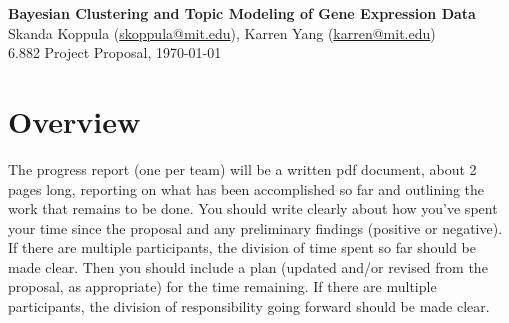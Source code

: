 \documentclass[11pt]{article}
\begin{document}
\begin{centering}
\Large
    \textbf{Bayesian Clustering and Topic Modeling of Gene Expression Data}  \\
    \vspace{2mm}
    \normalsize
    Skanda Koppula (\url{skoppula@mit.edu}), Karren Yang (\url{karren@mit.edu}) \\
    \vspace{2mm}
    \normalsize
    6.882 Project Proposal, \today \\
\end{centering}
\vspace{5mm}

\section{Overview}

The progress report (one per team) will be a written pdf document, about 2 pages long,
reporting on what has been accomplished so far and outlining the work that remains to be done.
You should write clearly about how you’ve spent your time since the proposal and any preliminary
findings (positive or negative). If there are multiple participants, the division of time spent
so far should be made clear. Then you should include a plan (updated and/or revised from the
proposal, as appropriate) for the time remaining. If there are multiple participants, the division of
responsibility going forward should be made clear.
\end{document}
